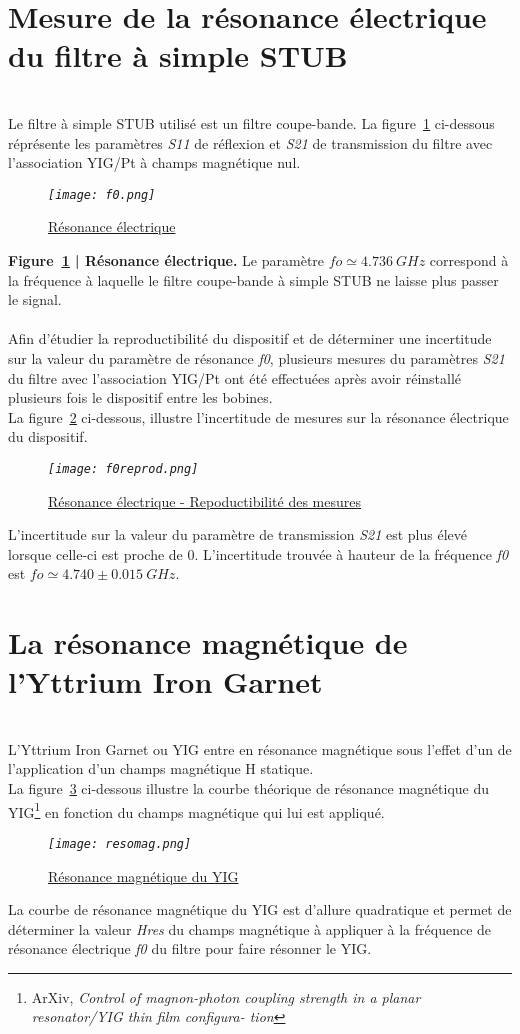 \documentclass[12pt,fleqn]{book} %
\begin{document}
\section{Mesure de la résonance électrique du filtre à simple STUB}
~\\\noindent Le filtre à simple STUB utilisé est un filtre coupe-bande. La figure~\underline{\color{blue}\ref{fo}} ci-dessous réprésente les paramètres \emph{S11} de réflexion et \emph{S21} de transmission du filtre avec l'association YIG/Pt à champs magnétique nul.
\begin{figure}[H]
	\centering
	\itshape
	\texttt{[image: f0.png]}
	\caption{\label{fo} \underline{Résonance électrique}}
\end{figure}
\noindent\footnotesize  \textbf{Figure~\underline{\color{blue}\ref{fo}} | Résonance électrique.} Le paramètre $ fo\simeq4.736\ GHz$ correspond à la fréquence à laquelle le filtre coupe-bande à simple STUB ne laisse plus passer le signal.
~\\\\
\normalsize Afin d'étudier la reproductibilité du dispositif et de déterminer une incertitude sur la valeur du paramètre de résonance \emph{f0}, plusieurs mesures du paramètres \emph{S21} du filtre avec l'association YIG/Pt ont été effectuées après avoir réinstallé plusieurs fois le dispositif entre les bobines. 
~\\La figure~\underline{\color{blue}\ref{foreprod}} ci-dessous, illustre l'incertitude de mesures sur la résonance électrique du dispositif.
\begin{figure}[H]
	\centering
	\itshape
	\texttt{[image: f0reprod.png]}
	\caption{\label{foreprod} \underline{Résonance électrique - Repoductibilité des mesures}}
\end{figure}
\noindent L'incertitude sur la valeur du paramètre de transmission \emph{\emph{S21}} est plus élevé lorsque celle-ci est proche de 0. L'incertitude trouvée à hauteur de la fréquence \emph{f0} est $ fo\simeq4.740\pm0.015\ GHz$.
\section{La résonance magnétique de l'Yttrium Iron Garnet}
~\\\noindent L'Yttrium Iron Garnet ou YIG entre en résonance magnétique sous l'effet d'un de l'application d'un champs magnétique H statique. 
~\\La figure~\underline{\color{blue}\ref{resomag}} ci-dessous illustre la courbe théorique de résonance magnétique du YIG\footnote{ArXiv, \emph{Control of magnon-photon coupling strength in a planar resonator/YIG thin film configura-
tion}} en fonction du champs magnétique qui lui est appliqué.
\begin{figure}[H]
	\centering
	\itshape
	\texttt{[image: resomag.png]}
	\caption{\label{resomag} \underline{Résonance magnétique du YIG}}
\end{figure}
\noindent La courbe de résonance magnétique du YIG est d'allure quadratique et permet de déterminer la valeur \emph{Hres} du champs magnétique à appliquer à la fréquence de résonance électrique \emph{f0} du filtre pour faire résonner le YIG. 
\end{document}
